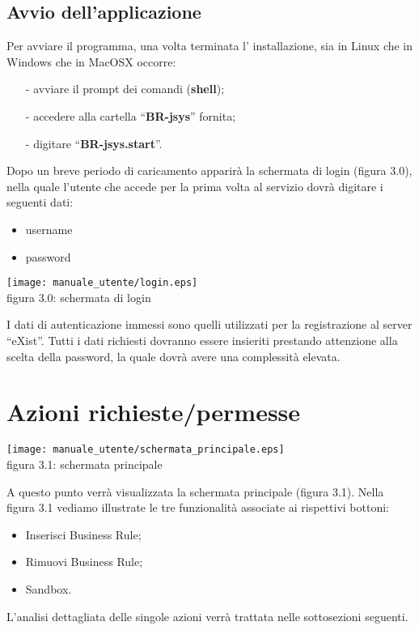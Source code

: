 \subsection{Avvio dell'applicazione}
Per avviare il programma, una volta terminata l' installazione, sia in Linux che in Windows che in MacOSX occorre:
\begin{itemize}
\item[-] avviare il prompt dei comandi (\textbf{shell});
\item[-] accedere alla cartella ``\textbf{BR-jsys}'' fornita; 
\item[-] digitare ``\textbf{BR-jsys.start}''.
\end{itemize}
 Dopo un breve periodo di caricamento apparir\`a la schermata di login (figura 3.0), nella quale l'utente che accede per la prima volta al servizio dovr\`a digitare i seguenti dati: 
\begin{itemize}
\item username
\item password
\end{itemize}
\begin{center}
\texttt{[image: manuale\_utente/login.eps]}\\
 figura 3.0: schermata di login
\end{center}
I dati di autenticazione immessi sono quelli utilizzati per la registrazione al server ``eXist''. Tutti i dati richiesti dovranno essere insieriti prestando attenzione alla scelta della password, la quale dovr\`a avere una complessit\`a elevata. 
\section{Azioni richieste/permesse}
\begin{center}
\texttt{[image: manuale\_utente/schermata\_principale.eps]}\\
 figura 3.1: schermata principale
\end{center}
A questo punto verr\`a visualizzata la schermata principale (figura 3.1).
Nella figura 3.1 vediamo illustrate le tre funzionalit\`a associate ai rispettivi bottoni:
\begin{itemize}
\item Inserisci Business Rule;
\item Rimuovi Business Rule;
\item Sandbox.
\end{itemize}
L'analisi dettagliata delle singole azioni verr\`a trattata nelle sottosezioni seguenti.
